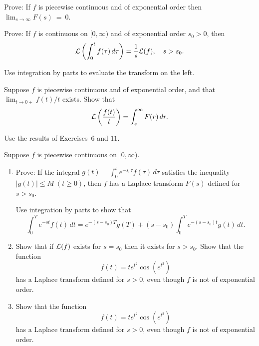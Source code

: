 \documentclass{ximera}
\begin{document}
\begin{problem}\label{exer:8.1.11}
 Prove: If $f$ is piecewise continuous and of exponential order
then $\lim_{s\to\infty}F(s)~=~0$.
\end{problem}

\begin{problem}\label{exer:8.1.12}
Prove: If $f$ is continuous on $[0,\infty)$ and of exponential order
$s_0>0$, then
$$
{\cal L}\left(\int^t_0 f(\tau)\,d\tau\right)=\frac{1}{s} {\cal L} (f),
\quad s>s_0.
$$
\begin{hint}
Use integration by parts to evaluate the transform on
the left. 
\end{hint}
\end{problem}

\begin{problem}\label{exer:8.1.13}
Suppose $f$ is piecewise continuous and of exponential
order, and that $\lim_{t\to 0+} f(t)/t$ exists.  Show that
$$
{\cal L}\left(\frac{f(t)}{t}\right)=\int^\infty_s F(r)\,dr.
$$
\begin{hint}
    Use  the results of Exercises~$6$ and $11$.
\end{hint}
\end{problem}

\begin{problem}\label{exer:8.1.14}
Suppose $f$ is piecewise continuous on $[0,\infty)$.
\begin{enumerate}
\item %
Prove: If the integral $g(t)=\int^t_0 e^{-s_0\tau} f(\tau)\,d\tau$
satisfies the inequality $|g(t)|\le M\; (t\ge 0)$, then $f$ has a
Laplace transform $F(s)$ defined for $s>s_0$.

\begin{hint}
Use integration by
parts to show that
$$
\int_0^T e^{-st}f(t)\,dt = e^{-(s-s_0)T}g(T)
+(s-s_0)\int_0^Te^{-(s-s_0)t}g(t)\,dt.
$$
\end{hint}

\item %
 Show that if ${\cal L}(f)$ exists for
$s=s_0$ then it exists for $s>s_0$.
Show that the function
$$
f(t)=te^{t^2}\cos(e^{t^2})
$$
has a Laplace transform defined for $s>0$, even though $f$ is not of exponential order.

\item %
Show that the function
$$
f(t)=te^{t^2}\cos(e^{t^2})
$$
has a Laplace transform defined for $s>0$, even though $f$ is not of exponential order.
\end{enumerate}
\end{problem}
\end{document}
